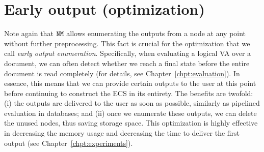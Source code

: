 %







\section{Early output (optimization)} 

Note again that $\mathtt{NM}$ allows enumerating the outputs from a node at any point
without further preprocessing. This fact is crucial for the optimization that we
call \emph{early output enumeration}. Specifically, when evaluating a logical VA
over a document, we can often detect whether we reach a final state before the
entire document is read completely (for details, see
Chapter~\ref{chpt:evaluation}). In essence, this means that we can provide
certain outputs to the user at this point before continuing to construct the ECS
in its entirety. The benefits are twofold: (i) the outputs are delivered to the
user as soon as possible, similarly as pipelined evaluation in databases; and
(ii) once we enumerate these outputs, we can delete the unused nodes, thus
saving storage space. This optimization is highly effective in decreasing the
memory usage and decreasing the time to deliver the first output (see
Chapter~\ref{chpt:experiments}).